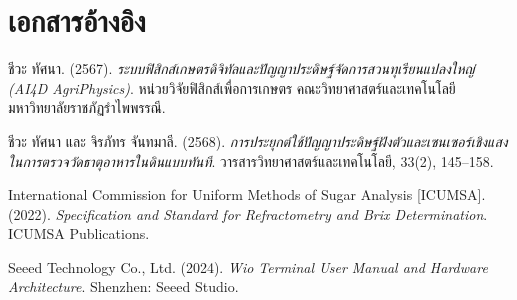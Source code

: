 \documentclass[12pt,a4paper,oneside]{book}
\begin{document}

\clearpage

{}
\tableofcontents
\clearpage

{}
\listoffigures
\clearpage

{}
\listoftables
\clearpage

\mainmatter







\appendix

\clearpage

\backmatter

\chapter*{เอกสารอ้างอิง}

\noindent ชีวะ ทัศนา. (2567). \textit{ระบบฟิสิกส์เกษตรดิจิทัลและปัญญาประดิษฐ์จัดการสวนทุเรียนแปลงใหญ่ (AI4D AgriPhysics)}. หน่วยวิจัยฟิสิกส์เพื่อการเกษตร คณะวิทยาศาสตร์และเทคโนโลยี มหาวิทยาลัยราชภัฏรำไพพรรณี.

\vspace{0.3cm}
\noindent ชีวะ ทัศนา และ จิรภัทร จันทมาลี. (2568). \textit{การประยุกต์ใช้ปัญญาประดิษฐ์ฝังตัวและเซนเซอร์เชิงแสงในการตรวจวัดธาตุอาหารในดินแบบทันที}. วารสารวิทยาศาสตร์และเทคโนโลยี, 33(2), 145--158.

\vspace{0.3cm}
\noindent International Commission for Uniform Methods of Sugar Analysis [ICUMSA]. (2022). \textit{Specification and Standard for Refractometry and Brix Determination}. ICUMSA Publications.

\vspace{0.3cm}
\noindent Seeed Technology Co., Ltd. (2024). \textit{Wio Terminal User Manual and Hardware Architecture}. Shenzhen: Seeed Studio.
\clearpage


\end{document}
